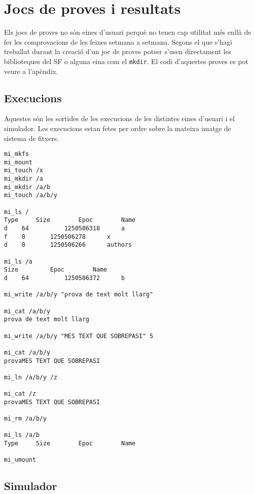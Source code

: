 \section{Jocs de proves i resultats}

Els jocs de proves no són eines d'usuari perquè no tenen cap utilitat més enllà
de fer les comprovacions de les feines setmana a setmana. Segons el que s'hagi
treballat durant la creació d'un joc de proves potser s'usen directament les
biblioteques del SF o alguna eina com el \verb+mkdir+. El codi d'aquestes
proves es pot veure a l'apèndix.

\subsection{Execucions}

Aquestes són les sortides de les execucions de les distintes eines d'usuari i
el simulador. Les execucions estan fetes per ordre sobre la mateixa imatge de
sistema de fitxers.


\begin{footnotesize}
\begin{verbatim}
mi_mkfs
mi_mount
mi_touch /x
mi_mkdir /a
mi_mkdir /a/b
mi_touch /a/b/y

mi_ls /
Type 	 Size 		 Epoc 		 Name 
d 	 64 		 1250506318 	 a 
f 	 0 		 1250506278 	 x 
d 	 0 		 1250506266 	 authors 

mi_ls /a
Size 		 Epoc 		 Name 
d 	 64 		 1250506372 	 b 

mi_write /a/b/y "prova de text molt llarg"

mi_cat /a/b/y
prova de text molt llarg

mi_write /a/b/y "MES TEXT QUE SOBREPASI" 5

mi_cat /a/b/y
provaMES TEXT QUE SOBREPASI

mi_ln /a/b/y /z

mi_cat /z
provaMES TEXT QUE SOBREPASI

mi_rm /a/b/y

mi_ls /a/b
Type 	 Size 		 Epoc 		 Name 

mi_umount
\end{verbatim}
\end{footnotesize}

\subsection{Simulador}


